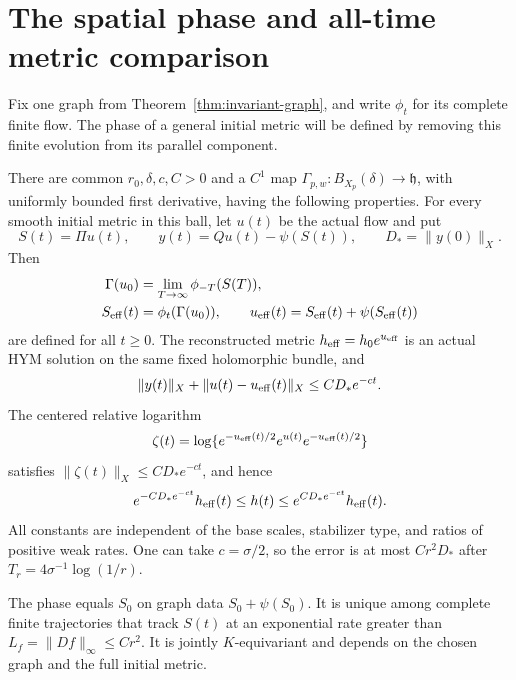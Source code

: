 \section{The spatial phase and all-time metric comparison}
\label{sec:phase-tracking}

Fix one graph from Theorem~\ref{thm:invariant-graph}, and
write $\phi_t$ for its complete finite flow. The phase
of a general initial metric will be defined by removing
this finite evolution from its parallel component.

\begin{theorem}\label{thm:all-time-tracking}
There are common $r_0,\delta,c,C>0$ and a $C^1$ map
$\Gamma_{p,w}:B_{X_p}(\delta)\to\mathfrak h$, with
uniformly bounded first derivative, having the following
properties. For every smooth initial metric in this ball,
let $u(t)$ be the actual flow and put
\[
 S(t)=\Pi u(t),\qquad
 y(t)=Qu(t)-\psi(S(t)),\qquad D_*=\|y(0)\|_X.
\]
Then
\begin{equation}\label{eq:phase-definition}
 \begin{split}
 \Gamma(u_0)&=\lim_{T\to\infty}\phi_{-T}(S(T)),\\
 S_{\rm eff}(t)&=\phi_t(\Gamma(u_0)),\qquad
 u_{\rm eff}(t)=S_{\rm eff}(t)+\psi(S_{\rm eff}(t))
 \end{split}
\end{equation}
are defined for all $t\ge0$. The reconstructed metric
$h_{\rm eff}=h_0e^{u_{\rm eff}}$ is an actual HYM solution
on the same fixed holomorphic bundle, and
\begin{equation}\label{eq:tracking-bounds}
 \|y(t)\|_X+\|u(t)-u_{\rm eff}(t)\|_X\le CD_*e^{-ct}.
\end{equation}
The centered relative logarithm
\begin{equation}\label{eq:centered-logarithm}
 \zeta(t)=\log\{e^{-u_{\rm eff}(t)/2}e^{u(t)}e^{-u_{\rm eff}(t)/2}\}
\end{equation}
satisfies $\|\zeta(t)\|_X\le CD_*e^{-ct}$, and hence
\begin{equation}\label{eq:metric-order-tracking}
 e^{-CD_*e^{-ct}}h_{\rm eff}(t)
       \le h(t)\le e^{CD_*e^{-ct}}h_{\rm eff}(t).
\end{equation}
All constants are independent of the base scales,
stabilizer type, and ratios of positive weak rates.
One can take $c=\sigma/2$, so the error is at most
$Cr^2D_*$ after $T_r=4\sigma^{-1}\log(1/r)$.

The phase equals $S_0$ on graph data $S_0+\psi(S_0)$.
It is unique among complete finite trajectories that
track $S(t)$ at an exponential rate greater than
$L_f=\|Df\|_\infty\le Cr^2$. It is jointly $K$-equivariant
and depends on the chosen graph and the full initial metric.
\end{theorem}

